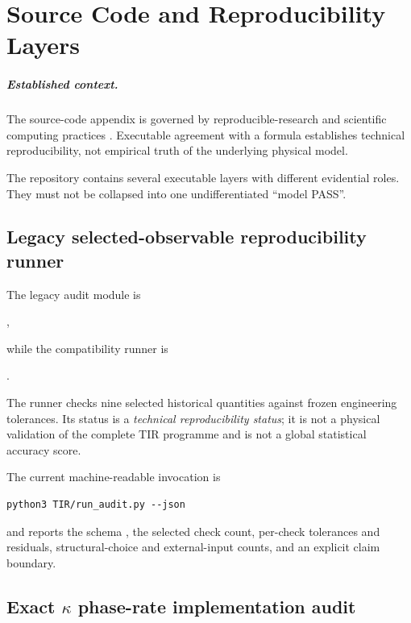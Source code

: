 \chapter{Source Code and Reproducibility Layers}
\label{app:source_code}

\paragraph{Established context.}
The source-code appendix is governed by reproducible-research and scientific
computing practices \cite{Sandve2013,Wilson2014,Munafo2017,Stark2018}.  Executable
agreement with a formula establishes technical reproducibility, not empirical
truth of the underlying physical model.

The repository contains several executable layers with different evidential
roles.  They must not be collapsed into one undifferentiated ``model PASS''.

\section{Legacy selected-observable reproducibility runner}

The legacy audit module is
\begin{center}
,
\end{center}
while the compatibility runner is
\begin{center}
.
\end{center}
The runner checks nine selected historical quantities against frozen engineering
tolerances.  Its status is a \emph{technical reproducibility status}; it is not a
physical validation of the complete TIR programme and is not a global statistical
accuracy score.

The current machine-readable invocation is
\begin{verbatim}
python3 TIR/run_audit.py --json
\end{verbatim}
and reports the schema
, the selected check count,
per-check tolerances and residuals, structural-choice and external-input counts,
and an explicit claim boundary.

\section{Exact $\kappa$ phase-rate implementation audit}

